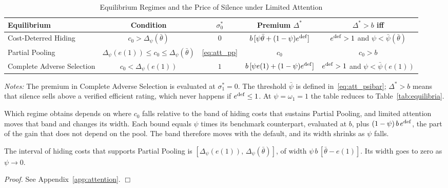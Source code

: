 \begin{table}[htbp]
\centering
\caption{Equilibrium Regimes and the Price of Silence under Limited Attention}
\label{tab:att_equilibria}
\small\renewcommand{\arraystretch}{1.5}
\begin{tabular*}{\textwidth}{@{\extracolsep{\fill}}lcccc@{}}
\toprule\toprule
\textbf{Equilibrium} & \textbf{Condition} & \textbf{$\sigma_0^*$} & \textbf{Premium $\Delta^*$} & \textbf{$\Delta^*>b$ iff} \\
\midrule
Cost-Deterred Hiding & $c_0>\Delta_\psi(\bar\theta)$ & $0$ & $b\,[\psi\bar\theta+(1-\psi)e^{\rm def}]$ & $e^{\rm def}>1$ and $\psi<\bar\psi(\bar\theta)$ \\
Partial Pooling & $\Delta_\psi(e(1))\le c_0\le\Delta_\psi(\bar\theta)$ & \eqref{eq:att_pp} & $c_0$ & $c_0>b$ \\
Complete Adverse Selection & $c_0<\Delta_\psi(e(1))$ & $1$ & $b\,[\psi e(1)+(1-\psi)e^{\rm def}]$ & $e^{\rm def}>1$ and $\psi<\bar\psi(e(1))$ \\
\bottomrule\bottomrule
\end{tabular*}

\vspace{0.5em}
\raggedright
\footnotesize
\textit{Notes:} The premium in Complete Adverse Selection is evaluated at $\sigma_1^*=0$. The threshold $\bar\psi$ is defined in~\eqref{eq:att_psibar}; $\Delta^*>b$ means that silence sells above a verified efficient rating, which never happens if $e^{\rm def}\le1$. At $\psi=\omega_1=1$ the table reduces to Table~\ref{tab:equilibria}.
\end{table}

Which regime obtains depends on where $c_0$ falls relative to the band of hiding costs that sustains Partial Pooling, and limited attention moves that band and changes its width. Each bound equals $\psi$ times its benchmark counterpart, evaluated at $b$, plus $(1-\psi)\,b\,e^{\rm def}$, the part of the gain that does not depend on the pool. The band therefore moves with the default, and its width shrinks as $\psi$ falls.

\begin{corollary}
\label{cor:att_band}
The interval of hiding costs that supports Partial Pooling is $[\Delta_\psi(e(1)),\,\Delta_\psi(\bar\theta)]$, of width $\psi\,b\,[\bar\theta-e(1)]$. Its width goes to zero as $\psi\to0$.
\end{corollary}

\noindent\textit{Proof.} See Appendix~\ref{app:attention}. $\Box$

